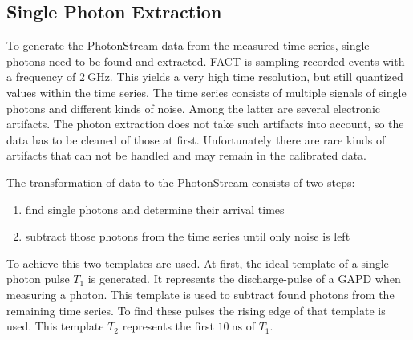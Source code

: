 \subsection{Single Photon Extraction}
%
To generate the PhotonStream data from the measured time series, single photons
need to be found and extracted. FACT is sampling recorded events with a
frequency of $\SI{2}{\giga\hertz}$. This yields a very high time resolution, but still quantized values within the time series. The time series consists of multiple signals
of single photons and different kinds of noise. Among the latter are several
electronic artifacts. The photon extraction does not take such artifacts into
account, so the data has to be cleaned of those at first. Unfortunately there
are rare kinds of artifacts that can not be handled and may remain in the
calibrated data.

The transformation of data to the PhotonStream consists of two steps:
%
\begin{enumerate}
  \item find single photons and determine their arrival times
  \item subtract those photons from the time series until only noise is left
\end{enumerate}
%
To achieve this two templates are used. At first, the ideal template of a
single photon pulse $T_1$ is generated. It represents the discharge-pulse of a
GAPD when measuring a photon. This template is used to subtract found photons
from the remaining time series. To find these pulses the rising edge of that
template is used. This template $T_2$ represents the first
$\SI{10}{\nano\second}$ of $T_1$.

